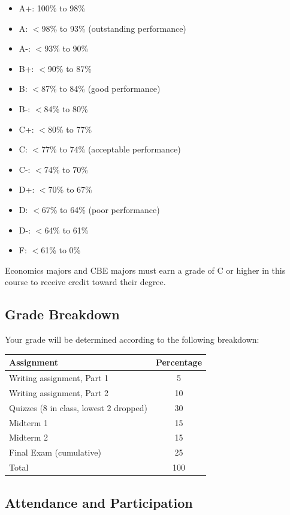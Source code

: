 \documentclass{syllabus}
\begin{document}
{
\begin{itemize}[nosep]
\item[] A+: 100\% to 98\%
\item[] A: $<$98\% to 93\% (outstanding performance)
\item[] A-: $<$93\% to 90\%
\item[] B+: $<$90\% to 87\%
\item[] B: $<$87\% to 84\% (good performance)
\item[] B-: $<$84\% to 80\%
\item[] C+: $<$80\% to 77\%
\item[] C: $<$77\% to 74\% (acceptable performance)
\item[] C-: $<$74\% to 70\%
\item[] D+: $<$70\% to 67\%
\item[] D: $<$67\% to 64\% (poor performance)
\item[] D-: $<$64\% to 61\%
\item[] F: $<$61\% to 0\%
\end{itemize}}

\noindent Economics majors and CBE majors must earn a grade of C or higher in this course to receive credit toward their degree.

\subsection*{Grade Breakdown}

\noindent Your grade will be determined according to the following breakdown:
\begin{center}
\begin{tabularx}{0.72\textwidth}{Xc}
\hline
  \textbf{Assignment}        & \textbf{Percentage} \\ \hline
Writing assignment, Part 1 & 5 \\
Writing assignment, Part 2 & 10 \\
Quizzes (8 in class, lowest 2 dropped) & 30 \\
Midterm 1 & 15 \\
Midterm 2 & 15 \\
Final Exam (cumulative) & 25 \\
\hline
Total & 100 \\
\hline
\end{tabularx}
\end{center}


\subsection*{Attendance and Participation}
\end{document}
